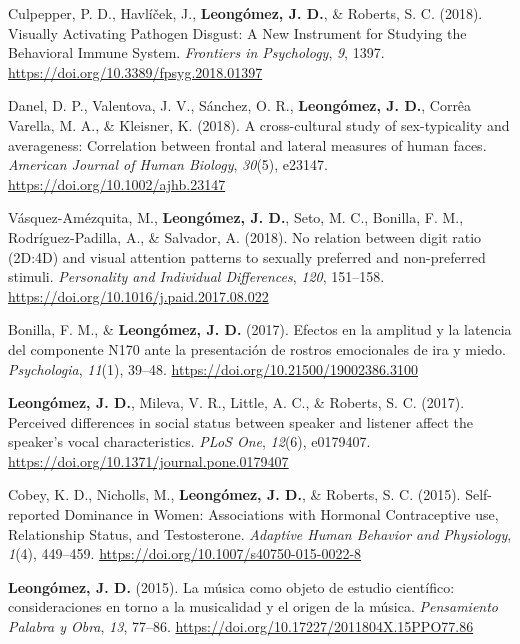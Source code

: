 \documentclass[11pt, a4paper]{awesome-cv}
\begin{document}
\leavevmode{}%
Culpepper, P. D., Havlíček, J., \textbf{Leongómez, J. D.}, \& Roberts,
S. C. (2018). {Visually Activating Pathogen Disgust: A New Instrument
for Studying the Behavioral Immune System}. \emph{Frontiers in
Psychology}, \emph{9}, 1397.
\url{https://doi.org/10.3389/fpsyg.2018.01397}

\leavevmode{}%
Danel, D. P., Valentova, J. V., Sánchez, O. R.,
\textbf{Leongómez, J. D.}, Corrêa Varella, M. A., \& Kleisner, K.
(2018). {A cross-cultural study of sex-typicality and averageness:
Correlation between frontal and lateral measures of human faces}.
\emph{American Journal of Human Biology}, \emph{30}(5), e23147.
\url{https://doi.org/10.1002/ajhb.23147}

\leavevmode{}%
Vásquez-Amézquita, M., \textbf{Leongómez, J. D.}, Seto, M. C., Bonilla,
F. M., Rodríguez-Padilla, A., \& Salvador, A. (2018). {No relation
between digit ratio (2D:4D) and visual attention patterns to sexually
preferred and non-preferred stimuli}. \emph{Personality and Individual
Differences}, \emph{120}, 151--158.
\url{https://doi.org/10.1016/j.paid.2017.08.022}

\leavevmode{}%
Bonilla, F. M., \& \textbf{Leongómez, J. D.} (2017). {Efectos en la
amplitud y la latencia del componente N170 ante la presentaci{ó}n de
rostros emocionales de ira y miedo}. \emph{Psychologia}, \emph{11}(1),
39--48. \url{https://doi.org/10.21500/19002386.3100}

\leavevmode{}%
\textbf{Leongómez, J. D.}, Mileva, V. R., Little, A. C., \& Roberts, S.
C. (2017). {Perceived differences in social status between speaker and
listener affect the speaker's vocal characteristics}. \emph{PLoS One},
\emph{12}(6), e0179407.
\url{https://doi.org/10.1371/journal.pone.0179407}

\leavevmode{}%
Cobey, K. D., Nicholls, M., \textbf{Leongómez, J. D.}, \& Roberts, S. C.
(2015). {Self-reported Dominance in Women: Associations with Hormonal
Contraceptive use, Relationship Status, and Testosterone}.
\emph{Adaptive Human Behavior and Physiology}, \emph{1}(4), 449--459.
\url{https://doi.org/10.1007/s40750-015-0022-8}

\leavevmode{}%
\textbf{Leongómez, J. D.} (2015). {La m{ú}sica como objeto de estudio
cient{í}fico: consideraciones en torno a la musicalidad y el origen de
la m{ú}sica}. \emph{Pensamiento Palabra y Obra}, \emph{13}, 77--86.
\url{https://doi.org/10.17227/2011804X.15PPO77.86}
\end{document}
